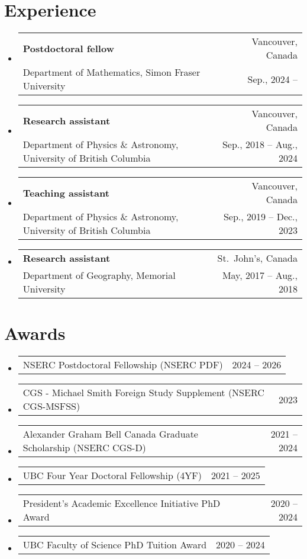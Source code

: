 \documentclass[letterpaper,11pt]{article}
\makeatletter
\newcommand{\ExperienceItem}[4]{
	\item{\vspace{-1pt}
		\begin{tabular*}{0.97\textwidth}{l@{\extracolsep{\fill}}r}
			\textbf{#1} & {#2}\\
			{#3} & {#4}
		\end{tabular*}
		\vspace{-5pt}
	}
}
\newcommand{\ExperienceSubItem}[2]{
	\item{\vspace{-3pt}
		\begin{tabular*}{0.92\textwidth}{l@{\extracolsep{\fill}}r}
			{\footnotesize #1} & {\footnotesize #2}
		\end{tabular*}
		\vspace{-5pt}
	}
}
\newcommand{\AwardsItem}[2]{
	\item{\vspace{-1pt}
		\begin{tabular*}{0.97\textwidth}{l@{\extracolsep{\fill}}r}
			{#1} & {#2}
		\end{tabular*}
		\vspace{-5pt}
	}
}
\makeatother
\begin{document}
\section*{Experience}
\begin{itemize}[leftmargin=*]
	\ExperienceItem{Postdoctoral fellow}{Vancouver, Canada}{Department of Mathematics, Simon Fraser University}{Sep., 2024 --}
	
	\ExperienceItem{Research assistant}{Vancouver, Canada}{Department of Physics \& Astronomy, University of British Columbia}{Sep., 2018 -- Aug., 2024}
	
	\ExperienceItem{Teaching assistant}{Vancouver, Canada}{Department of Physics \& Astronomy, University of British Columbia}{Sep., 2019 -- Dec., 2023}
	
	\ExperienceItem{Research assistant}{St.~John's, Canada}{Department of Geography, Memorial University}{May, 2017 -- Aug., 2018}
\end{itemize}

\section*{Awards}
\begin{itemize}[leftmargin=*]
	\AwardsItem{NSERC Postdoctoral Fellowship (NSERC PDF)}{2024 -- 2026}
	\AwardsItem{CGS - Michael Smith Foreign Study Supplement (NSERC CGS-MSFSS)}{2023}
	\AwardsItem{Alexander Graham Bell Canada Graduate Scholarship (NSERC CGS-D)}{2021 -- 2024}
	\AwardsItem{UBC Four Year Doctoral Fellowship (4YF)}{2021 -- 2025}
	\AwardsItem{President's Academic Excellence Initiative PhD Award}{2020 -- 2024}
	\AwardsItem{UBC Faculty of Science PhD Tuition Award }{2020 -- 2024}
\end{itemize}
\end{document}
